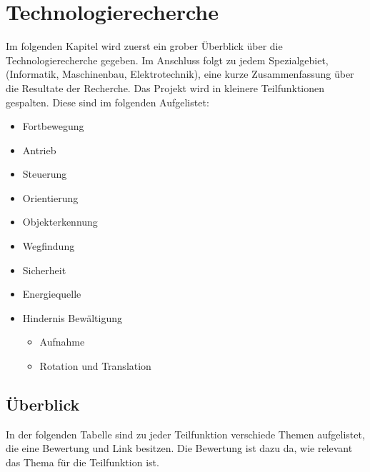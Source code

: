 \newpage
\section{Technologierecherche}

Im folgenden Kapitel wird zuerst ein grober Überblick über die Technologierecherche gegeben. Im Anschluss folgt zu jedem Spezialgebiet, (Informatik, Maschinenbau, Elektrotechnik), eine kurze Zusammenfassung über die Resultate der Recherche. Das Projekt wird in kleinere Teilfunktionen gespalten. Diese sind im folgenden Aufgelistet:
\begin{itemize}
    \item Fortbewegung
    \item Antrieb
    \item Steuerung
    \item Orientierung
    \item Objekterkennung
    \item Wegfindung
    \item Sicherheit
    \item Energiequelle
    \item Hindernis Bewältigung
    \begin{itemize}
        \item Aufnahme
        \item Rotation und Translation
    \end{itemize}
\end{itemize}


\subsection{Überblick}
In der folgenden Tabelle sind zu jeder Teilfunktion verschiede Themen aufgelistet, die eine Bewertung und Link besitzen. Die Bewertung ist dazu da, wie relevant das Thema für die Teilfunktion ist.

